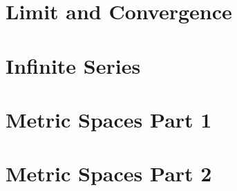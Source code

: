 \documentclass[10pt,a4paper]{article}
\begin{document}


\section{Limit and Convergence}




\section{Infinite Series}






\section{Metric Spaces Part 1}





\section{Metric Spaces Part 2}




\end{document}
